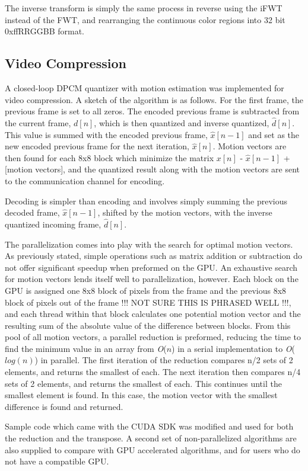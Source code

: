 \documentclass[10pt,twocolumn,twoside]{IEEEtran}
\renewcommand{\O}[1]{\textit{O}(\ensuremath{#1})}
\begin{document}
The inverse transform is simply the same process in reverse using the iFWT instead of the FWT, and rearranging the continuous color regions into 32 bit 0xffRRGGBB format.

\subsection{Video Compression}
A closed-loop DPCM quantizer with motion estimation was implemented for video compression. A sketch of the algorithm is as follows. For the first frame, the previous frame is set to all zeros. The encoded previous frame is subtracted from the current frame, $d[n]$, which is then quantized and inverse quantized, $\hat{d}[n]$. This value is summed with the encoded previous frame, $\hat{x}[n-1]$ and set as the new encoded previous frame for the next iteration, $\hat{x}[n]$. Motion vectors are then found for each 8x8 block which minimize the matrix $x[n]$ - $\hat{x}[n-1]$ + [motion vectors], and the quantized result along with the motion vectors are sent to the communication channel for encoding.

Decoding is simpler than encoding and involves simply summing the previous decoded frame, $\hat{x}[n-1]$, shifted by the motion vectors, with the inverse quantized incoming frame, $\hat{d}[n]$.

The parallelization comes into play with the search for optimal motion vectors. As previously stated, simple operations such as matrix addition or subtraction do not offer significant speedup when preformed on the GPU. An exhaustive search for motion vectors lends itself well to parallelization, however. Each block on the GPU is assigned one 8x8 block of pixels from the frame and the previous 8x8 block of pixels out of the frame !!! NOT SURE THIS IS PHRASED WELL !!!, and each thread within that block calculates one potential motion vector and the resulting sum of the absolute value of the difference between blocks. From this pool of all motion vectors, a parallel reduction is preformed, reducing the time to find the minimum value in an array from \O{n} in a serial implementation to \O{log(n)} in parallel. The first iteration of the reduction compares n/2 sets of 2 elements, and returns the smallest of each. The next iteration then compares n/4 sets of 2 elements, and returns the smallest of each. This continues until the smallest element is found. In this case, the motion vector with the smallest difference is found and returned.

Sample code which came with the CUDA SDK was modified and used for both the reduction and the transpose. A second set of non-parallelized algorithms are also supplied to compare with GPU accelerated algorithms, and for users who do not have a compatible GPU.
\end{document}
